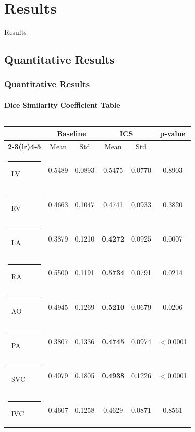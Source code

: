 \documentclass[nometaot,lecture,amberg,toc=twocolumn,indicatelastpageofframe,footlinebox]{OTHAWbeamer}
\begin{document}
\section{Results}
\begin{breakframe}
    Results
\end{breakframe}

\subsection{Quantitative Results}
\begin{frame}[t, label=quantresults]
    \frametitle{Quantitative Results}
    \framesubtitle{Dice Similarity Coefficient Table}

    \vspace*{-0.15cm}

    \begin{columns}[c]


            
            \centering
            {\scriptsize
            \setlength{\arrayrulewidth}{0.8pt}
            \begin{tabular}{>{\bfseries}l ccc cc}
                \toprule
                \multicolumn{1}{l}{Region} & \multicolumn{2}{c}{Baseline} & \multicolumn{2}{c}{ICS} & p-value \\
                \cmidrule(lr){2-3}\cmidrule(lr){4-5}
                & Mean & Std & Mean & Std & \\
                \midrule
                \textcolor{red}{\rule{0.5em}{0.5em}}~LV
                    & 0.5489 & 0.0893 & \textcolor{orange1}{0.5475} & 0.0770 & 0.8903 \\[2pt]
                \textcolor{blau1}{\rule{0.5em}{0.5em}}~RV
                    & 0.4663 & 0.1047 & \textcolor{orange1}{0.4741} & 0.0933 & 0.3820 \\[2pt]
                \textcolor[rgb]{0.95,0.45,0.65}{\rule{0.5em}{0.5em}}~LA
                    & 0.3879 & 0.1210 & \textbf{0.4272} & 0.0925 & 0.0007 \\[2pt]
                \textcolor{cyan1}{\rule{0.5em}{0.5em}}~RA
                    & 0.5500 & 0.1191 & \textbf{0.5734} & 0.0791 & 0.0214 \\[2pt]
                \textcolor{orange1}{\rule{0.5em}{0.5em}}~AO
                    & 0.4945 & 0.1269 & \textbf{0.5210} & 0.0679 & 0.0206 \\[2pt]
                \textcolor{gruen1}{\rule{0.5em}{0.5em}}~PA
                    & 0.3807 & 0.1336 & \textbf{0.4745} & 0.0974 & $<$0.0001 \\[2pt]
                \textcolor{lila1}{\rule{0.5em}{0.5em}}~SVC
                    & 0.4079 & 0.1805 & \textbf{0.4938} & 0.1226 & $<$0.0001 \\[2pt]
                \textcolor[rgb]{0.9,0.8,0.05}{\rule{0.5em}{0.5em}}~IVC
                    & 0.4607 & 0.1258 & \textcolor{orange1}{0.4629} & 0.0871 & 0.8561 \\
                \bottomrule
            \end{tabular}
            }


\end{columns}
\end{frame}
\end{document}
